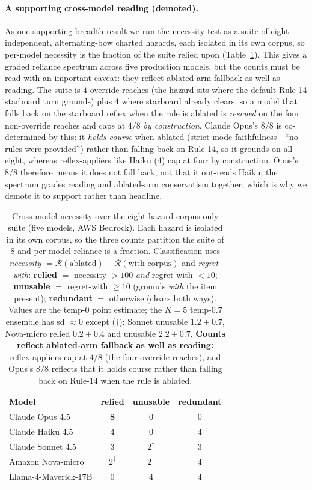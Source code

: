 \documentclass{article}
\newcommand{\regret}{\mathcal{R}}
\begin{document}
\paragraph{A supporting cross-model reading (demoted).} As one supporting breadth result we run the
necessity test as a suite of eight independent, alternating-bow charted hazards, each isolated in its
own corpus, so per-model necessity is the fraction of the suite relied upon
(Table~\ref{tab:disc}). This gives a graded reliance spectrum across five production models, but the
counts must be read with an important caveat: they reflect ablated-arm fallback as well as reading. The
suite is $4$ override reaches (the hazard sits where the default Rule-14 starboard turn grounds) plus
$4$ where starboard already clears, so a model that falls back on the starboard reflex when the rule is
ablated is \emph{rescued} on the four non-override reaches and caps at $4/8$ \emph{by construction}.
Claude Opus's $8/8$ is co-determined by this: it \emph{holds course} when ablated (strict-mode
faithfulness---``no rules were provided'') rather than falling back on Rule-14, so it grounds on all
eight, whereas reflex-appliers like Haiku ($4$) cap at four by construction. Opus's $8/8$ therefore
means it does not fall back, not that it out-reads Haiku; the spectrum grades reading and ablated-arm
conservatism together, which is why we demote it to support rather than headline.

\begin{table}[t]
\centering
\small
\begin{tabular}{@{}lccc@{}}
\toprule
Model & relied & unusable & redundant \\
\midrule
Claude Opus 4.5      & $\mathbf{8}$   & $0$            & $0$ \\
Claude Haiku 4.5     & $4$            & $0$            & $4$ \\
Claude Sonnet 4.5    & $3$            & $2^{\dagger}$  & $3$ \\
Amazon Nova-micro    & $2^{\dagger}$  & $2^{\dagger}$  & $4$ \\
Llama-4-Maverick-17B & $0$            & $4$            & $4$ \\
\bottomrule
\end{tabular}
\caption{Cross-model necessity over the eight-hazard corpus-only suite (five models, AWS Bedrock).
Each hazard is isolated in its own corpus, so the three counts partition the suite of $8$ and per-model
reliance is a fraction. Classification uses \emph{necessity}
$=\regret(\text{ablated})-\regret(\text{with-corpus})$ and \emph{regret-with}: \textbf{relied} $=$
necessity $>100$ \emph{and} regret-with $<10$; \textbf{unusable} $=$ regret-with $\ge 10$ (grounds
\emph{with} the item present); \textbf{redundant} $=$ otherwise (clears both ways). Values are the
temp-$0$ point estimate; the $K{=}5$ temp-$0.7$ ensemble has sd $\approx\!0$ except ($\dagger$): Sonnet
unusable $1.2\pm0.7$, Nova-micro relied $0.2\pm0.4$ and unusable $2.2\pm0.7$. \textbf{Counts reflect
ablated-arm fallback as well as reading:} reflex-appliers cap at $4/8$ (the four override reaches), and
Opus's $8/8$ reflects that it holds course rather than falling back on Rule-14 when the rule is ablated.}
\label{tab:disc}
\end{table}
\end{document}
